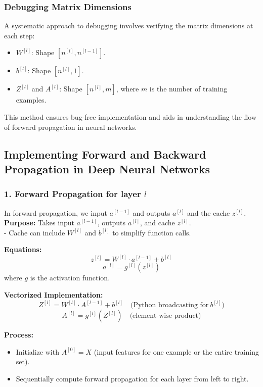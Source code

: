 \documentclass[letterpaper,12pt,notitlepage,twoside]{report}
\begin{document}
\subsubsection*{Debugging Matrix Dimensions}

A systematic approach to debugging involves verifying the matrix dimensions at each step:
\begin{itemize}
    \item \( W^{[l]} \): Shape \( [n^{[l]}, n^{[l-1]}] \).
    \item \( b^{[l]} \): Shape \( [n^{[l]}, 1] \).
    \item \( Z^{[l]} \) and \( A^{[l]} \): Shape \( [n^{[l]}, m] \), where \( m \) is the number of training examples.
\end{itemize}

This method ensures bug-free implementation and aids in understanding the flow of forward propagation in neural networks.

\subsection{Implementing Forward and Backward Propagation in Deep Neural Networks}

\subsubsection{1. Forward Propagation for layer $l$}
In forward propagation, we input \(a^{[l-1]}\) and outputs \(a^{[l]}\) and the cache \(z^{[l]}\). \\
\textbf{Purpose:} Takes input \(a^{[l-1]}\), outputs \(a^{[l]}\), and cache \(z^{[l]}\).  \\
- Cache can include \(W^{[l]}\) and \(b^{[l]}\) to simplify function calls.

\textbf{Equations:}
\[
z^{[l]} = W^{[l]} \cdot a^{[l-1]} + b^{[l]}
\]
\[
a^{[l]} = g^{[l]}(z^{[l]})
\]
where \(g\) is the activation function.

\textbf{Vectorized Implementation:}
\[
Z^{[l]} = W^{[l]} \cdot A^{[l-1]} + b^{[l]} \quad \text{(Python broadcasting for}~b^{[l]})
\]
\[
A^{[l]} = g^{[l]}(Z^{[l]}) \quad \text{(element-wise product)}
\]

\textbf{Process:}
\begin{itemize}[nosep]
\item Initialize with \(A^{[0]} = X\) (input features for one example or the entire training set).
\item Sequentially compute forward propagation for each layer from left to right.
\end{itemize}
\end{document}
